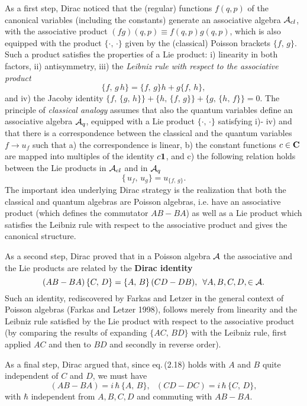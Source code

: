\documentclass[12pt]{article}
\def \be {\begin{equation}}
\def \ee {\end{equation}}
\def \ra {\rightarrow}
\def \eqq {\equiv}
\def \A {{\cal A}}
\def \id {{\bf 1 }}
\def \Cbf {{\bf C}}
\begin{document}
As a first step, Dirac noticed that the (regular) functions $f(q, p)$ of the canonical variables (including the constants) generate an associative  algebra $\A_{cl}$, with the associative product $(f g)(q, p) \eqq f(q, p) g(q, p)$,    which is also equipped with the  product $ \{ \cdot, \, \cdot \}$ given  by the (classical) Poisson brackets $ \{ f, \, g \} $.
Such a product satisfies the properties of a Lie product: i) linearity in both factors, ii) antisymmetry, iii) the {\em Leibniz rule with respect to the associative product} $$\{ f,\, g\,h \} = \{ f, \,g\} h + g \{ f,\, h \},$$ and iv) the Jacoby identity $ \{ f, \,\{ g,\, h \} \} + \{ h, \,\{ f,\, g \} \} + \{ g, \,\{ h,\, f \} \} = 0.$
The  principle of {\em classical analogy} assumes that also  the quantum variables define an associative algebra $\A_q$, equipped with a Lie product $\{ \cdot, \, \cdot \}$ satisfying i)- iv) and that there is a correspondence between the classical and the quantum variables $ f \ra u_f$ such that a)  the correspondence is linear, 
b) the   constant functions  $c \in \Cbf$ are mapped into multiples of the identity $c \id$,  and 
c) the following relation holds between the Lie products in $\A_{cl}$ and in $\A_q$ \be{ \{ \,u_f, \,u_g \} = u_{\{ f,\, g \}}.}\ee
The important idea underlying Dirac strategy is the realization that both the classical and quantum algebras are Poisson algebras, i.e. have an associative product (which defines the commutator $A B - B A$) as well as a Lie product which  satisfies the Leibniz rule with respect to the associative product and gives  the canonical structure. 

As a second step, Dirac proved that in a Poisson algebra $\A$ the associative and the Lie products  are related by the {\bf Dirac identity} \be{ (A B - B A) \,\{ C, \, D\} = \{ A,\, B\}\, (C D - D B), \,\,\, \forall A, B, C, D, \in \A.}\ee 
Such an identity, rediscovered by Farkas and Letzer  in the general context of Poisson algebras (Farkas and Letzer 1998), follows merely from linearity and the Leibniz rule satisfied by the Lie product with respect to the associative product (by comparing the results of expanding $\{ A C, \,B D \}$ with the Leibniz rule, first applied $A C$ and then to  $B D$ and secondly in reverse order). 
  

As a final step, Dirac argued that,  since eq.\,(2.18)  holds  with $A$ and $B$ quite independent of $C$ and $D$, we  must have \be{( A B - B A ) = i \,\hbar\, \{ A, \,B \}, \,\,\,\,(C D - D C) = i \,\hbar \, \{ C, \, D \}, }\ee
with $\hbar$ independent from $A, B,  C, D$ and commuting with $A B - B A$. 
\end{document}

